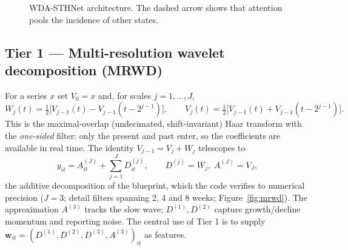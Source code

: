 \documentclass[11pt,a4paper]{article}
\begin{document}
\begin{figure}[H]\centering
{}
\caption{WDA-STHNet architecture. The dashed arrow shows that attention pools the incidence of other states.}\label{fig:arch}
\end{figure}

\subsection{Tier 1 --- Multi-resolution wavelet decomposition (MRWD)}
For a series $x$ set $V_0=x$ and, for scales $j=1,\dots,J$,
\begin{equation}
W_j(t)=\tfrac12\big[V_{j-1}(t)-V_{j-1}(t-2^{j-1})\big],\qquad V_j(t)=\tfrac12\big[V_{j-1}(t)+V_{j-1}(t-2^{j-1})\big].
\label{eq:modwt}
\end{equation}
This is the maximal-overlap (undecimated, shift-invariant) Haar transform with the \emph{one-sided} filter: only the present and past enter, so the coefficients are available in real time. The identity $V_{j-1}=V_j+W_j$ telescopes to
\begin{equation}
y_{it}=A^{(J)}_{it}+\sum_{j=1}^{J}D^{(j)}_{it},\qquad D^{(j)}=W_j,\; A^{(J)}=V_J,
\label{eq:additive}
\end{equation}
the additive decomposition of the blueprint, which the code verifies to numerical precision ($J=3$; detail filters spanning 2, 4 and 8 weeks; Figure~\ref{fig:mrwd}). The approximation $A^{(3)}$ tracks the slow wave; $D^{(1)},D^{(2)}$ capture growth/decline momentum and reporting noise. The central use of Tier 1 is to supply $\bm w_{it}=(D^{(1)},D^{(2)},D^{(3)},A^{(3)})_{it}$ as features.
\end{document}
